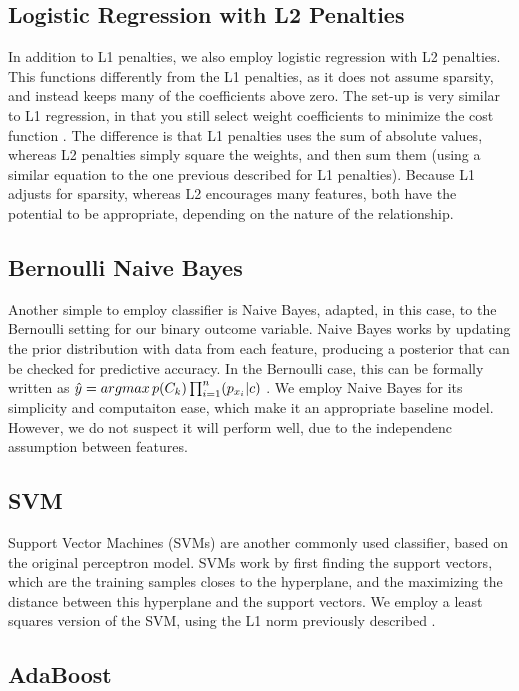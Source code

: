 \documentclass[12pt]{article}
\begin{document}
\subsection{Logistic Regression with L2 Penalties}

In addition to L1 penalties, we also employ logistic regression with L2 penalties. This functions differently from the L1 penalties, as it does not assume sparsity, and instead keeps many of the coefficients above zero. The set-up is very similar to L1 regression, in that you still select weight coefficients to minimize the cost function \citep{hoerl}. The difference is that L1 penalties uses the sum of absolute values, whereas L2 penalties simply square the weights, and then sum them (using a similar equation to the one previous described for L1 penalties). Because L1 adjusts for sparsity, whereas L2 encourages many features, both have the potential to be appropriate, depending on the nature of the relationship.

\subsection{Bernoulli Naive Bayes}

Another simple to employ classifier is Naive Bayes, adapted, in this case, to the Bernoulli setting for our binary outcome variable. Naive Bayes works by updating the prior distribution with data from each feature, producing a posterior that can be checked for predictive accuracy. In the Bernoulli case, this can be formally written as $\hat{y} = argmax\thinspace p(C_{k})\prod_{i=1}^{n}(p_{x_{i}}|c)$ \citep{mccallum}. We employ Naive Bayes for its simplicity and computaiton ease, which make it an appropriate baseline model. However, we do not suspect it will perform well, due to the independenc assumption between features.

\subsection{SVM}

Support Vector Machines (SVMs) are another commonly used classifier, based on the original perceptron model. SVMs work by first finding the support vectors, which are the training samples closes to the hyperplane, and the maximizing the distance between this hyperplane and the support vectors. We employ a least squares version of the SVM, using the L1 norm previously described \citep{suykens}.
 
\subsection{AdaBoost}
\end{document}

